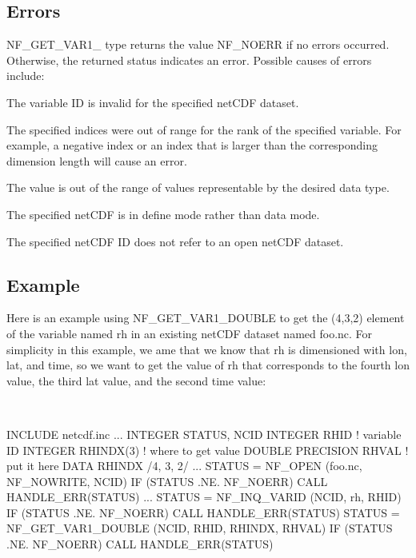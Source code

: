 \subsection*{Errors }

N\+F\+\_\+\+G\+E\+T\+\_\+\+V\+A\+R1\+\_\+ type returns the value N\+F\+\_\+\+N\+O\+E\+RR if no errors occurred. Otherwise, the returned status indicates an error. Possible causes of errors include\+:


\begin{DoxyItemize}
\item The variable ID is invalid for the specified net\+C\+DF dataset.
\item The specified indices were out of range for the rank of the specified variable. For example, a negative index or an index that is larger than the corresponding dimension length will cause an error.
\item The value is out of the range of values representable by the desired data type.
\item The specified net\+C\+DF is in define mode rather than data mode.
\item The specified net\+C\+DF ID does not refer to an open net\+C\+DF dataset.
\end{DoxyItemize}

\subsection*{Example }

Here is an example using N\+F\+\_\+\+G\+E\+T\+\_\+\+V\+A\+R1\+\_\+\+D\+O\+U\+B\+LE to get the (4,3,2) element of the variable named rh in an existing net\+C\+DF dataset named foo.\+nc. For simplicity in this example, we ame that we know that rh is dimensioned with lon, lat, and time, so we want to get the value of rh that corresponds to the fourth lon value, the third lat value, and the second time value\+:

 

I\+N\+C\+L\+U\+DE \textquotesingle{}netcdf.\+inc\textquotesingle{} ... I\+N\+T\+E\+G\+ER S\+T\+A\+T\+US, N\+C\+ID I\+N\+T\+E\+G\+ER R\+H\+ID ! variable ID I\+N\+T\+E\+G\+ER R\+H\+I\+N\+D\+X(3) ! where to get value D\+O\+U\+B\+LE P\+R\+E\+C\+I\+S\+I\+ON R\+H\+V\+AL ! put it here D\+A\+TA R\+H\+I\+N\+DX /4, 3, 2/ ... S\+T\+A\+T\+US = N\+F\+\_\+\+O\+P\+EN (\textquotesingle{}foo.\+nc\textquotesingle{}, N\+F\+\_\+\+N\+O\+W\+R\+I\+TE, N\+C\+ID) IF (S\+T\+A\+T\+US .NE. N\+F\+\_\+\+N\+O\+E\+RR) C\+A\+LL H\+A\+N\+D\+L\+E\+\_\+\+E\+R\+R(\+S\+T\+A\+T\+U\+S) ... S\+T\+A\+T\+US = N\+F\+\_\+\+I\+N\+Q\+\_\+\+V\+A\+R\+ID (N\+C\+ID, \textquotesingle{}rh\textquotesingle{}, R\+H\+ID) IF (S\+T\+A\+T\+US .NE. N\+F\+\_\+\+N\+O\+E\+RR) C\+A\+LL H\+A\+N\+D\+L\+E\+\_\+\+E\+R\+R(\+S\+T\+A\+T\+U\+S) S\+T\+A\+T\+US = N\+F\+\_\+\+G\+E\+T\+\_\+\+V\+A\+R1\+\_\+\+D\+O\+U\+B\+LE (N\+C\+ID, R\+H\+ID, R\+H\+I\+N\+DX, R\+H\+V\+AL) IF (S\+T\+A\+T\+US .NE. N\+F\+\_\+\+N\+O\+E\+RR) C\+A\+LL H\+A\+N\+D\+L\+E\+\_\+\+E\+R\+R(\+S\+T\+A\+T\+U\+S)


